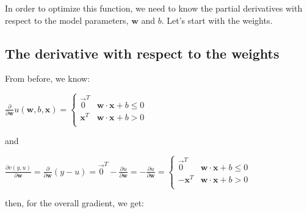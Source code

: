 \documentclass[11pt]{article}
\begin{document}
In order to optimize this function, we need to know the partial derivatives with respect to the model parameters, $\mathbf{w}$ and $b$. Let's start with the weights. 

\subsection{The derivative with respect to the weights}

From before, we know:

$\frac{\partial }{\partial \mathbf{w}} u(\mathbf{w},b,\mathbf{x}) = \begin{cases}
	\vec{0}^T & \mathbf{w} \cdot \mathbf{x} + b \leq 0\\
	\mathbf{x}^T & \mathbf{w} \cdot \mathbf{x} + b > 0\\
\end{cases}$

and

$\frac{\partial v(y,u)}{\partial \mathbf{w}} = \frac{\partial}{\partial \mathbf{w}} (y - u) = \vec{0}^T - \frac{\partial u}{\partial \mathbf{w}} = -\frac{\partial u}{\partial \mathbf{w}} = \begin{cases}
	\vec{0}^T & \mathbf{w} \cdot \mathbf{x} + b \leq 0\\
	-\mathbf{x}^T & \mathbf{w} \cdot \mathbf{x} + b > 0\\
\end{cases}$

then, for the overall gradient, we get:
\end{document}
